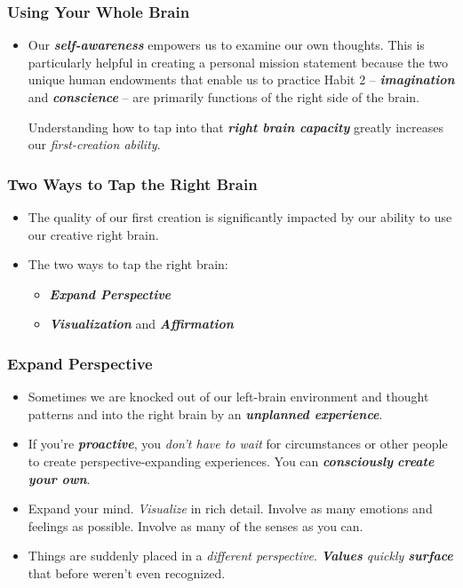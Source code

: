 \documentclass[11pt]{article}
\begin{document}
\subsubsection{Using Your Whole Brain}
\begin{itemize}
\item Our \emph{\textbf{self-awareness}} empowers us to examine our own thoughts. This is particularly helpful in creating a personal mission statement because the two unique human endowments that enable us to practice Habit 2 -- \emph{\textbf{imagination}} and \emph{\textbf{conscience}} -- are primarily functions of the right side of the brain.

Understanding how to tap into that \emph{\textbf{right brain capacity}} greatly increases our \emph{first-creation ability}.
\end{itemize}
\subsubsection{Two Ways to Tap the Right Brain}
\begin{itemize}
\item The quality of our first creation is significantly impacted by our ability to use our creative right brain.

\item The two ways to tap the right brain:
\begin{itemize}
\item \emph{\textbf{Expand Perspective}}
\item \emph{\textbf{Visualization}} and \emph{\textbf{Affirmation}}
\end{itemize}
\end{itemize}
\subsubsection{Expand Perspective}
\begin{itemize}
\item Sometimes we are knocked out of our left-brain environment and thought patterns and into the right brain by an \emph{\textbf{unplanned experience}}. 

\item If you're \emph{\textbf{proactive}}, you \emph{don't have to wait} for circumstances or other people to create perspective-expanding experiences. You can \emph{\textbf{consciously} \textbf{create your own}}.

\item Expand your mind. \emph{Visualize} in rich detail. Involve as many emotions and feelings as possible. Involve as many of the senses as you can.

\item Things are suddenly placed in a \emph{different perspective}. \emph{\textbf{Values} quickly \textbf{surface}} that before weren't even recognized.
\end{itemize}
\end{document}
